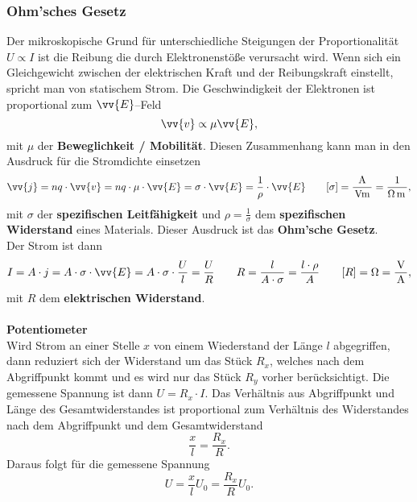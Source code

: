 \documentclass[a4paper,12pt]{article}
\begin{document}
\subsubsection{Ohm'sches Gesetz}
Der mikroskopische Grund für unterschiedliche Steigungen der Proportionalität $U\propto I$ ist die Reibung die durch Elektronenstöße verursacht wird. Wenn sich ein Gleichgewicht zwischen der elektrischen Kraft und der Reibungskraft einstellt, spricht man von statischem Strom. Die Geschwindigkeit der Elektronen ist proportional zum $\vv{E}$--Feld
\[ 
        \vv{v}\propto \mu \vv{E}
,\] 
mit $\mu $ der \textbf{Beweglichkeit / Mobilität}. Diesen Zusammenhang kann man in den Ausdruck für die Stromdichte einsetzen
\[ 
        \vv{j}=nq\cdot \vv{v}=nq\cdot \mu \cdot \vv{E}=\sigma \cdot \vv{E}=\dfrac{1}{\rho }\cdot \vv{E}\qquad [\sigma ]=\dfrac{\,\text{A}\,}{\,\text{Vm}\,}=\dfrac{1}{\Omega \,\text{m}\,}
,\] 
mit $\sigma $ der \textbf{spezifischen Leitfähigkeit} und $\rho =\tfrac{1}{\sigma }$ dem \textbf{spezifischen Widerstand} eines Materials. Dieser Ausdruck ist das \textbf{Ohm'sche Gesetz}.\\\indent
Der Strom ist dann
\[ 
        I=A\cdot j=A\cdot \sigma \cdot \vv{E}=A\cdot \sigma \cdot \dfrac{U}{l}=\dfrac{U}{R}\qquad R=\dfrac{l}{A\cdot \sigma }=\dfrac{l\cdot \rho }{A}\qquad [R]=\Omega =\dfrac{\,\text{V}\,}{\,\text{A}\,}
,\]
mit $R$ dem \textbf{elektrischen Widerstand}.
\\\hfill\\\textbf{Potentiometer}\\ 
Wird Strom an einer Stelle $x$ von einem Wiederstand der Länge $l$ abgegriffen, dann reduziert sich der Widerstand um das Stück $R_x$, welches nach dem Abgriffpunkt kommt und es wird nur das Stück $R_y$ vorher berücksichtigt. Die gemessene Spannung ist dann $U=R_x\cdot I$. Das Verhältnis aus Abgriffpunkt und Länge des Gesamtwiderstandes ist proportional zum Verhältnis des Widerstandes nach dem Abgriffpunkt und dem Gesamtwiderstand
\[ 
        \dfrac{x}{l}=\dfrac{R_x}{R}
.\] 
Daraus folgt für die gemessene Spannung
\[ 
        U=\dfrac{x}{l}U_0=\dfrac{R_x}{R}U_0
.\] 
\end{document}
